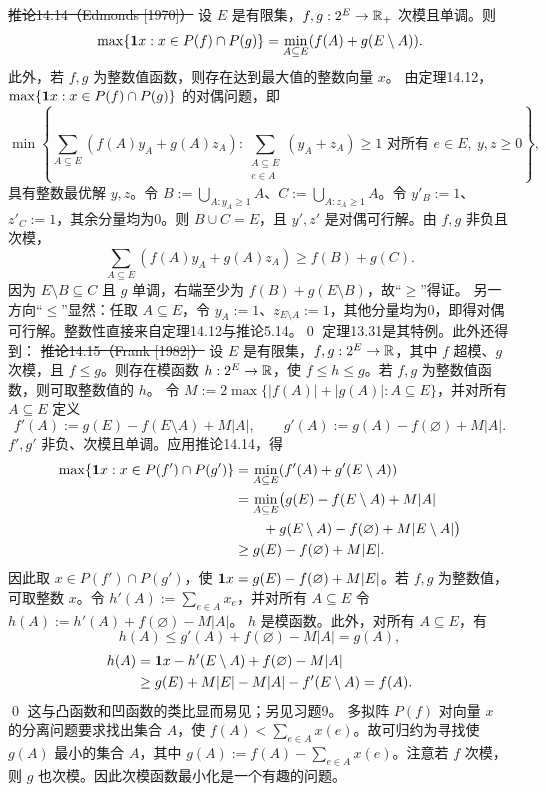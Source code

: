 \st{推论14.14（Edmonds [1970]）} 设 $E$ 是有限集，$f,g:2^E\to\mathbb R_+$ 次模且单调。则
\[\max\{\mathbf 1 x:x\in P(f)\cap P(g)\}=\min_{A\subseteq E}(f(A)+g(E\setminus A)).\]
此外，若 $f,g$ 为整数值函数，则存在达到最大值的整数向量 $x$。
\pr 由定理14.12，$\max\{\mathbf 1 x:x\in P(f)\cap P(g)\}$ 的对偶问题，即
\[\min\left\{\sum_{A\subseteq E}(f(A)y_A+g(A)z_A):\sum_{\substack{A\subseteq E\\e\in A}}(y_A+z_A)\ge1\text{ 对所有 }e\in E,\ y,z\ge0\right\},\]
具有整数最优解 $y,z$。令 $B:=\bigcup_{A:y_A\ge1}A$、$C:=\bigcup_{A:z_A\ge1}A$。令 $y'_B:=1$、$z'_C:=1$，其余分量均为0。则 $B\cup C=E$，且 $y',z'$ 是对偶可行解。由 $f,g$ 非负且次模，
\[\sum_{A\subseteq E}(f(A)y_A+g(A)z_A)\ge f(B)+g(C).\]
因为 $E\setminus B\subseteq C$ 且 $g$ 单调，右端至少为 $f(B)+g(E\setminus B)$，故“$\ge$”得证。
另一方向“$\le$”显然：任取 $A\subseteq E$，令 $y_A:=1$、$z_{E\setminus A}:=1$，其他分量均为0，即得对偶可行解。整数性直接来自定理14.12与推论5.14。\qed
定理13.31是其特例。此外还得到：
\st{推论14.15（Frank [1982]）} 设 $E$ 是有限集，$f,g:2^E\to\mathbb R$，其中 $f$ 超模、$g$ 次模，且 $f\le g$。则存在模函数 $h:2^E\to\mathbb R$，使 $f\le h\le g$。若 $f,g$ 为整数值函数，则可取整数值的 $h$。
\pr 令 $M:=2\max\{|f(A)|+|g(A)|:A\subseteq E\}$，并对所有 $A\subseteq E$ 定义
\[f'(A):=g(E)-f(E\setminus A)+M|A|,\qquad g'(A):=g(A)-f(\varnothing)+M|A|.\]
$f',g'$ 非负、次模且单调。应用推论14.14，得
\begin{align*}
\max\{\mathbf 1 x:x\in P(f')\cap P(g')\}
&=\min_{A\subseteq E}(f'(A)+g'(E\setminus A))\\
&=\min_{A\subseteq E}\bigl(g(E)-f(E\setminus A)+M|A|\\
&\qquad+g(E\setminus A)-f(\varnothing)+M|E\setminus A|\bigr)\\
&\ge g(E)-f(\varnothing)+M|E|.
\end{align*}
因此取 $x\in P(f')\cap P(g')$，使 $\mathbf 1 x=g(E)-f(\varnothing)+M|E|$。若 $f,g$ 为整数值，可取整数 $x$。令 $h'(A):=\sum_{e\in A}x_e$，并对所有 $A\subseteq E$ 令 $h(A):=h'(A)+f(\varnothing)-M|A|$。
$h$ 是模函数。此外，对所有 $A\subseteq E$，有
\[h(A)\le g'(A)+f(\varnothing)-M|A|=g(A),\]
\begin{align*}
h(A)&=\mathbf 1 x-h'(E\setminus A)+f(\varnothing)-M|A|\\
&\ge g(E)+M|E|-M|A|-f'(E\setminus A)=f(A).
\end{align*}\qed
这与凸函数和凹函数的类比显而易见；另见习题9。
多拟阵 $P(f)$ 对向量 $x$ 的分离问题要求找出集合 $A$，使 $f(A)<\sum_{e\in A}x(e)$。故可归约为寻找使 $g(A)$ 最小的集合 $A$，其中 $g(A):=f(A)-\sum_{e\in A}x(e)$。注意若 $f$ 次模，则 $g$ 也次模。因此次模函数最小化是一个有趣的问题。

